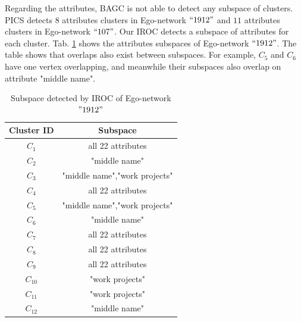 Regarding the attributes, BAGC is not able to detect any subspace of clusters. PICS detects $8$ attributes clusters in Ego-network $``1912"$ and $11$ attributes clusters in Ego-network $``107"$. Our IROC detects a subspace of attributes for each cluster. Tab. \ref{tab:subspace1912} shows the attributes subspaces of Ego-network $``1912"$. The table shows that overlaps also exist between subspaces. For example, $C_5$ and $C_6$ have one vertex overlapping, and meanwhile their subspaces also overlap on attribute "middle name".

\begin{table}[h]
\center\caption{Subspace detected by IROC  of Ego-network $"1912"$}
\small
\begin{tabular}{|c|c|}
\hline
Cluster ID & Subspace\\
\hline
$C_1$ & all 22 attributes\\
\hline
$C_2$ & "middle name"\\
\hline
$C_3$ & "middle name","work projects"\\
\hline
$C_4$ & all 22 attributes\\
\hline
$C_5$ & "middle name","work projects"\\
\hline
$C_6$ & "middle name"\\
\hline
$C_7$ & all 22 attributes\\
\hline
$C_8$ & all 22 attributes\\
\hline
$C_9$ & all 22 attributes\\
\hline
$C_{10}$ & "work projects"\\
\hline
$C_{11}$ & "work projects"\\
\hline
$C_{12}$ & "middle name"\\
\hline
\end{tabular}
\label{tab:subspace1912}
\end{table}



